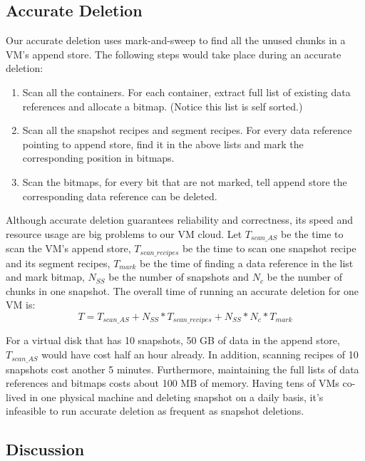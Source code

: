 \subsection{Accurate Deletion}
Our accurate deletion uses mark-and-sweep to find all the unused chunks in a VM's append store.
The following steps would take place during an accurate deletion:

\begin{enumerate}
\item Scan all the containers. For each container, extract full list of existing data references and allocate a bitmap. 
(Notice this list is self sorted.)
\item Scan all the snapshot recipes and segment recipes. For every data reference pointing to append store,
find it in the above lists and mark the corresponding position in bitmaps.
\item Scan the bitmaps, for every bit that are not marked, tell append store the corresponding data reference can be deleted.
\end{enumerate}

Although accurate deletion guarantees reliability and correctness, its speed and resource usage are big problems to our VM cloud.
Let $T_{scan\_AS}$ be the time to scan the VM's append store, $T_{scan\_recipes}$ be the time to scan one snapshot recipe
and its segment recipes, $T_{mark}$ be the time of finding a data reference in the list and mark bitmap, 
$N_{SS}$ be the number of snapshots and $N_c$ be the number of chunks in one snapshot.
The overall time of running an accurate deletion for one VM is:
\begin{equation}
T = T_{scan\_AS} + N_{SS} * T_{scan\_recipes} + N_{SS} * N_c * T_{mark}
\end{equation}

For a virtual disk that has 10 snapshots, 50 GB of data in the append store, $T_{scan\_AS}$ would have cost half an hour already.
In addition, scanning recipes of 10 snapshots cost another 5 minutes.
Furthermore, maintaining the full lists of data references and bitmaps costs about 100 MB of memory. Having tens of VMs
co-lived in one physical machine and deleting snapshot on a daily basis, 
it's infeasible to run accurate deletion as frequent as snapshot deletions.

\subsection{Discussion}
